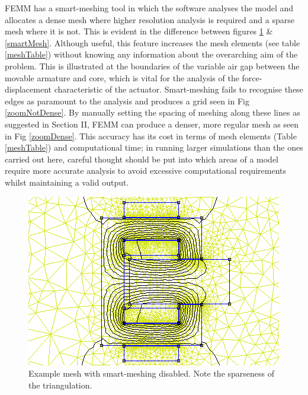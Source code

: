 \documentclass[a4paper]{IEEEtran}
\begin{document}
    FEMM has a smart-meshing tool in which the software analyses the model and allocates a dense mesh where higher resolution analysis is required and a sparse mesh where it is not. This is evident in the difference between figures \ref{noSmartMesh} \& \ref{smartMesh}. Although useful, this feature increases the mesh elements (see table \ref{meshTable}) without knowing any information about the overarching aim of the problem. This is illustrated at the boundaries of the variable air gap between the movable armature and core, which is vital for the analysis of the force-displacement characteristic of the actuator. Smart-meshing fails to recognise these edges as paramount to the analysis and produces a grid seen in Fig \ref{zoomNotDense}. By manually setting the spacing of meshing along these lines as suggested in \cite{labPartB} Section II, FEMM can produce a denser, more regular mesh as seen in Fig \ref{zoomDense}. This accuracy has its cost in terms of mesh elements (Table \ref{meshTable}) and computational time; in running larger simulations than the ones carried out here, careful thought should be put into which areas of a model require more accurate analysis to avoid excessive computational requirements whilst maintaining a valid output.

    \begin{figure}[ht]
        \includegraphics[width = \linewidth]{Smartmesh-OFF-NotDenseAirgap.png}
        \caption{Example mesh with smart-meshing disabled. Note the sparseness of the triangulation.}
        \label{noSmartMesh} 
    \end{figure}
\end{document}

